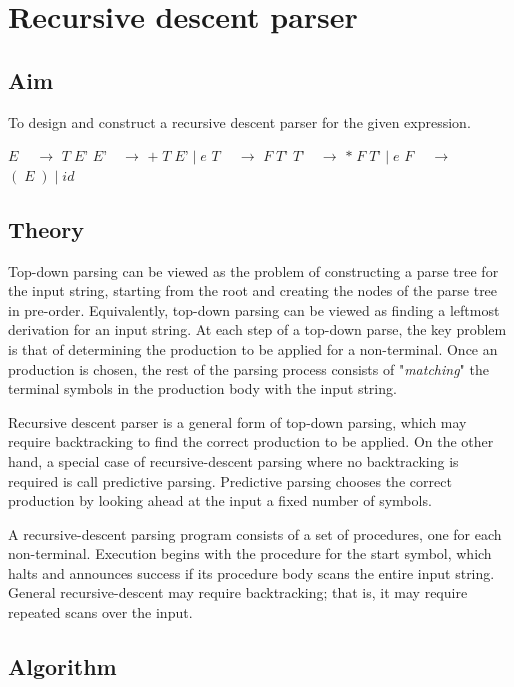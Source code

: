 

\clearpage
\chapter{Recursive descent parser}

\section{Aim}
To design and construct a recursive descent parser for the given expression.
\begin{algorithmic}[1]
	\State $E\: \quad \rightarrow$ $T \; E’$
	\State $E’  \quad \rightarrow$ $+ \; T \; E’ \; | \; e$
	\State $T\: \quad \rightarrow$ $F \; T’$
	\State $T’  \quad \rightarrow$ $* \; F \; T’ \; | \; e$
	\State $F\: \quad \rightarrow$ $( \; E \; ) \; | \; id$
\end{algorithmic}




\section{Theory}
Top-down parsing can be viewed as the problem of constructing a parse tree for the input string, starting from the root and creating the nodes of the parse tree in pre-order. Equivalently, top-down parsing can be viewed as finding a leftmost derivation for an input string. At each step of a top-down parse, the key problem is that of determining
the production to be applied for a non-terminal. Once an production is chosen, the rest of the parsing process consists of "\textit{matching}" the terminal symbols in the production body with the input string.


Recursive descent parser is a general form of top-down parsing, which may require backtracking to find the correct production to be applied. On the other hand, a special case of recursive-descent parsing where no backtracking is required is call predictive parsing. Predictive parsing chooses the correct production by looking ahead at the input a fixed number
of symbols.

A recursive-descent parsing program consists of a set of procedures, one for each
non-terminal. Execution begins with the procedure for the start symbol, which halts and announces success if its procedure body scans the entire input string.
General recursive-descent may require backtracking; that is, it may require
repeated scans over the input.

\section{Algorithm}

